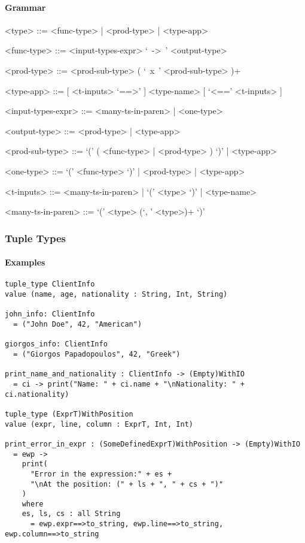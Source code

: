 \documentclass{article}
\begin{document}
\paragraph{Grammar}

\begin{grammar}

<type> ::= <func-type> | <prod-type> | <type-app>

<func-type> ::= <input-types-expr> `\ ->\ ' <output-type>

<prod-type> ::= <prod-sub-type> ( `\ x\ ' <prod-sub-type> )+

<type-app> ::= [ <t-inputs> `==>' ] <type-name> [ `<==' <t-inputs> ]
 
<input-types-expr> ::= <many-ts-in-paren> | <one-type>

<output-type> ::= <prod-type> | <type-app>

<prod-sub-type> ::= `(' ( <func-type> | <prod-type> ) `)' | <type-app>

<one-type> ::= `(' <func-type> `)' | <prod-type> | <type-app>

<t-inputs> ::= <many-ts-in-paren> | `(' <type> `)' | <type-name>

<many-ts-in-paren> ::=  `(' <type> (`, ' <type>)+ `)'

\end{grammar}
\subsubsection{Tuple Types}

\paragraph{Examples}

\begin{verbatim}
tuple_type ClientInfo
value (name, age, nationality : String, Int, String)

john_info: ClientInfo
  = ("John Doe", 42, "American")

giorgos_info: ClientInfo
  = ("Giorgos Papadopoulos", 42, "Greek")

print_name_and_nationality : ClientInfo -> (Empty)WithIO
  = ci -> print("Name: " + ci.name + "\nNationality: " + ci.nationality)

tuple_type (ExprT)WithPosition
value (expr, line, column : ExprT, Int, Int)

print_error_in_expr : (SomeDefinedExprT)WithPosition -> (Empty)WithIO
  = ewp ->
    print(
      "Error in the expression:" + es +
      "\nAt the position: (" + ls + ", " + cs + ")"
    )
    where
    es, ls, cs : all String
      = ewp.expr==>to_string, ewp.line==>to_string, ewp.column==>to_string
\end{verbatim}
\end{document}
